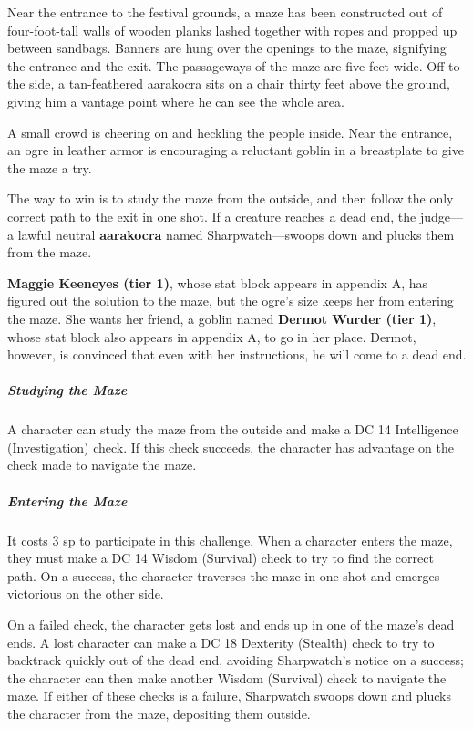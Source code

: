 \documentclass[10pt,a4paper,twoside,fancy,bg=print,twocolumn,openany,nodeprecatedcode]{dndbook}
\begin{document}
\begin{DndReadAloud}{}
Near the entrance to the festival grounds, a maze has been constructed out of four-foot-tall walls of wooden planks lashed together with ropes and propped up between sandbags. Banners are hung over the openings to the maze, signifying the entrance and the exit. The passageways of the maze are five feet wide. Off to the side, a tan-feathered aarakocra sits on a chair thirty feet above the ground, giving him a vantage point where he can see the whole area.

A small crowd is cheering on and heckling the people inside. Near the entrance, an ogre in leather armor is encouraging a reluctant goblin in a breastplate to give the maze a try.

\end{DndReadAloud}

The way to win is to study the maze from the outside, and then follow the only correct path to the exit in one shot. If a creature reaches a dead end, the judge—a lawful neutral \textbf{aarakocra} named Sharpwatch—swoops down and plucks them from the maze.

\textbf{Maggie Keeneyes (tier 1)}, whose stat block appears in appendix A, has figured out the solution to the maze, but the ogre's size keeps her from entering the maze. She wants her friend, a goblin named \textbf{Dermot Wurder (tier 1)}, whose stat block also appears in appendix A, to go in her place. Dermot, however, is convinced that even with her instructions, he will come to a dead end.

\subparagraph{Studying the Maze}
A character can study the maze from the outside and make a DC 14 Intelligence (Investigation) check. If this check succeeds, the character has advantage on the check made to navigate the maze.

\subparagraph{Entering the Maze}
It costs 3 sp to participate in this challenge. When a character enters the maze, they must make a DC 14 Wisdom (Survival) check to try to find the correct path. On a success, the character traverses the maze in one shot and emerges victorious on the other side.

On a failed check, the character gets lost and ends up in one of the maze's dead ends. A lost character can make a DC 18 Dexterity (Stealth) check to try to backtrack quickly out of the dead end, avoiding Sharpwatch's notice on a success; the character can then make another Wisdom (Survival) check to navigate the maze. If either of these checks is a failure, Sharpwatch swoops down and plucks the character from the maze, depositing them outside.
\end{document}
